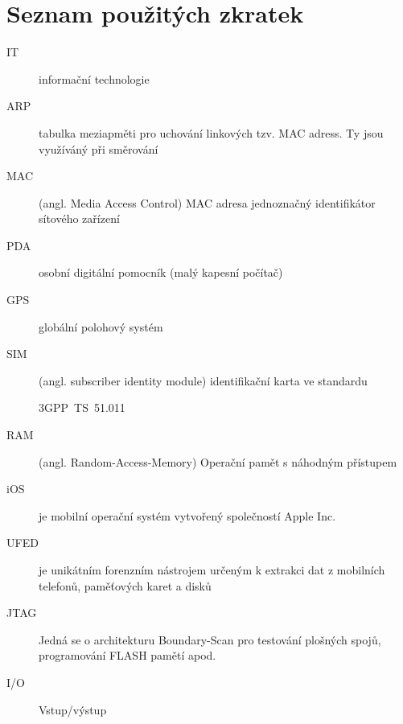 \documentclass[thesis=B,czech]{FITthesis}[2012/06/26]
\begin{document}
\chapter{Seznam použitých zkratek}
\begin{description}

    \item[IT] informační technologie
    \item[ARP] tabulka meziapměti pro uchování linkových tzv. MAC adress. Ty jsou využíváný při směrování
    \item[MAC] (angl. Media Access Control) MAC adresa jednoznačný identifikátor sítového zařízení
    \item[PDA] osobní digitální pomocník (malý kapesní počítač)
   
    \item[GPS] globální polohový systém
    \item[SIM] (angl. subscriber identity module) identifikační karta ve standardu
    
     3GPP~TS~51.011
    \item[RAM] (angl. Random-Access-Memory) Operační pamět s náhodným přístupem
    \item[iOS] je mobilní operační systém vytvořený společností Apple Inc.
    \item[UFED] je unikátním forenzním nástrojem určeným k extrakci dat z mobilních telefonů, paměťových karet a disků
    \item[JTAG] Jedná se o architekturu Boundary-Scan pro testování plošných spojů, programování FLASH pamětí apod.
    \item[I/O] Vstup/výstup


\end{description}
\end{document}
